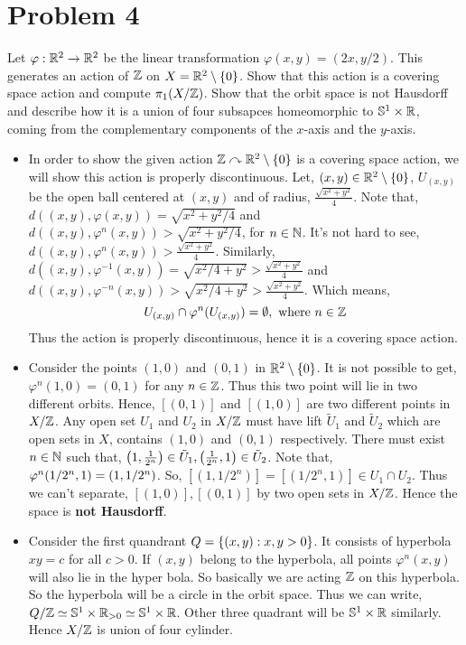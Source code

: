 \documentclass[11pt]{article}
\begin{document}
\section{Problem 4}

\begin{prob}{}{}
    Let $\varphi : \mathbb{R}^2 \to \mathbb{R}^2$ be the linear transformation $\varphi(x,y) = (2x,y/2)$. This generates an action of $\mathbb{Z}$ on $X = \mathbb{R}^2 \setminus \{0\}$. Show that this action is a covering space action and compute $\pi_1(X/\mathbb{Z})$. Show that the orbit space is not Hausdorff and describe how it is a union of four subsapces homeomorphic to $\mathbb{S}^1 \times \mathbb{R}$, coming from the complementary components of the $x$-axis and the $y$-axis.
\end{prob}

\sol \begin{itemize}
  \item In order to show the given action $\mathbb{Z} \curvearrowright \mathbb{R}^2\setminus \qty{0}$ is a covering space action, we will show this action is properly discontinuous. Let, $(x,y)\in \mathbb{R}^2 \setminus \qty{0}$, $U_{(x,y)}$ be the open ball centered at $(x,y)$ and of radius, \(\frac{\sqrt{x^2+y^2}}{4}\). Note that, $d((x,y),\varphi(x,y)) = \sqrt{x^2 + y^2/4}$ and $d((x,y),\varphi^n(x,y)) > \sqrt{x^2 + y^2/4}$, for $n \in \mathbb{N}$. It's not hard to see, \(d((x,y),\varphi^n(x,y))>\frac{\sqrt{x^2+y^2}}{4}\). Similarly, \(d((x,y),\varphi^{-1}(x,y)) = \sqrt{x^2/4 + y^2} > \frac{\sqrt{x^2+y^2}}{4}\) and \(d((x,y),\varphi^{-n}(x,y)) > \sqrt{x^2/4 + y^2} > \frac{\sqrt{x^2+y^2}}{4}\). Which means, $$U_{(x,y)} \cap \varphi^n(U_{(x,y)}) = \emptyset , \text{ where } n \in \mathbb{Z}$$ Thus the action is properly discontinuous, hence it is a covering space action. 
  \item Consider the points $(1,0)$ and $(0,1)$ in $\mathbb{R}^2 \setminus \qty{0}$. It is not possible to get, $\varphi^n(1,0) = (0,1)$ for any $n \in \mathbb{Z}$. Thus this two point will lie in two different orbits. Hence, $[(0,1)]$ and $[(1,0)]$ are two different points in $X/\mathbb{Z}$. Any open set $U_1$ and $U_2$ in $X/\mathbb{Z}$ must have lift $\tilde{U}_1$ and $\tilde{U}_2$ which are open sets in $X$, contains $(1,0)$ and $(0,1)$ respectively. There must exist $n \in \mathbb{N}$ such that, \(\qty(1,\frac{1}{2^n})\in \tilde{U}_1 , \qty(\frac{1}{2^n},1) \in \tilde{U}_2\). Note that, \(\varphi^n\qty(1/2^n,1) = \qty(1,1/2^n)\). So, $[(1,1/2^n)] = [(1/2^n,1)] \in U_1 \cap U_2$. Thus we can't separate, $[(1,0)],[(0,1)]$ by two open sets in $X /\mathbb{Z}$. Hence the space is \textbf{\textsf{not Hausdorff}}. 
  \item Consider the first quandrant $Q=\qty{(x,y): x,y>0}$. It consists of hyperbola $xy =c$ for all $c>0$. If $(x,y)$ belong to the hyperbola, all points $\varphi^n(x,y)$ will also lie in the hyper bola. So basically we are acting $\mathbb{Z}$ on this hyperbola. So the hyperbola will be a circle in the orbit space. Thus we can write, $Q/\mathbb{Z} \simeq \mathbb{S}^1 \times \mathbb{R}_{>0} \simeq \mathbb{S}^1 \times \mathbb{R}$. Other three quadrant will be $\mathbb{S}^1 \times \mathbb{R}$ similarly. Hence $X/\mathbb{Z}$ is union of four cylinder. 

\end{itemize}
\end{document}
